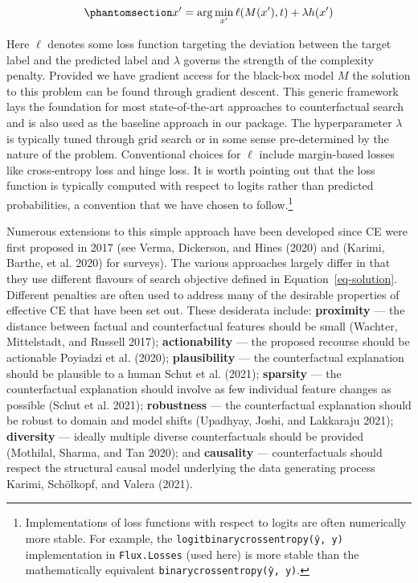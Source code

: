 \documentclass{juliacon}
\begin{document}
\begin{equation}\phantomsection\label{eq-solution}{
x^\prime = \arg \min_{x^\prime}  \ell(M(x^\prime),t) + \lambda h(x^\prime)
}\end{equation}

Here \(\ell\) denotes some loss function targeting the deviation between
the target label and the predicted label and \(\lambda\) governs the
strength of the complexity penalty. Provided we have gradient access for
the black-box model \(M\) the solution to this problem can be found
through gradient descent. This generic framework lays the foundation for
most state-of-the-art approaches to counterfactual search and is also
used as the baseline approach in our package. The hyperparameter
\(\lambda\) is typically tuned through grid search or in some sense
pre-determined by the nature of the problem. Conventional choices for
\(\ell\) include margin-based losses like cross-entropy loss and hinge
loss. It is worth pointing out that the loss function is typically
computed with respect to logits rather than predicted probabilities, a
convention that we have chosen to follow.\footnote{Implementations of
  loss functions with respect to logits are often numerically more
  stable. For example, the \texttt{logitbinarycrossentropy(ŷ,\ y)}
  implementation in \texttt{Flux.Losses} (used here) is more stable than
  the mathematically equivalent \texttt{binarycrossentropy(ŷ,\ y)}.}

Numerous extensions to this simple approach have been developed since CE
were first proposed in 2017 (see Verma, Dickerson, and Hines (2020) and
(Karimi, Barthe, et al. 2020) for surveys). The various approaches
largely differ in that they use different flavours of search objective
defined in Equation~\ref{eq-solution}. Different penalties are often
used to address many of the desirable properties of effective CE that
have been set out. These desiderata include: \textbf{proximity} --- the
distance between factual and counterfactual features should be small
(Wachter, Mittelstadt, and Russell 2017); \textbf{actionability} --- the
proposed recourse should be actionable Poyiadzi et al. (2020);
\textbf{plausibility} --- the counterfactual explanation should be
plausible to a human Schut et al. (2021); \textbf{sparsity} --- the
counterfactual explanation should involve as few individual feature
changes as possible (Schut et al. 2021); \textbf{robustness} --- the
counterfactual explanation should be robust to domain and model shifts
(Upadhyay, Joshi, and Lakkaraju 2021); \textbf{diversity} --- ideally
multiple diverse counterfactuals should be provided (Mothilal, Sharma,
and Tan 2020); and \textbf{causality} --- counterfactuals should respect
the structural causal model underlying the data generating process
Karimi, Schölkopf, and Valera (2021).
\end{document}
